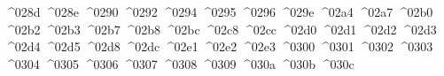 {  ^^^^028d%
  ^^^^028e%
  ^^^^0290%
  ^^^^0292%
  ^^^^0294%
  ^^^^0295%
  ^^^^0296%
  ^^^^029e%
  ^^^^02a4%
  ^^^^02a7%
  ^^^^02b0%
  ^^^^02b2%
  ^^^^02b3%
  ^^^^02b7%
  ^^^^02b8%
  ^^^^02bc%
  ^^^^02c8%
  ^^^^02cc%
  ^^^^02d0%
  ^^^^02d1%
  ^^^^02d2%
  ^^^^02d3%
  ^^^^02d4%
  ^^^^02d5%
  ^^^^02d8%
  ^^^^02dc%
  ^^^^02e1%
  ^^^^02e2%
  ^^^^02e3%
  ^^^^0300%
  ^^^^0301%
  ^^^^0302%
  ^^^^0303%
  ^^^^0304%
  ^^^^0305%
  ^^^^0306%
  ^^^^0307%
  ^^^^0308%
  ^^^^0309%
  ^^^^030a%
  ^^^^030b%
  ^^^^030c%
}
